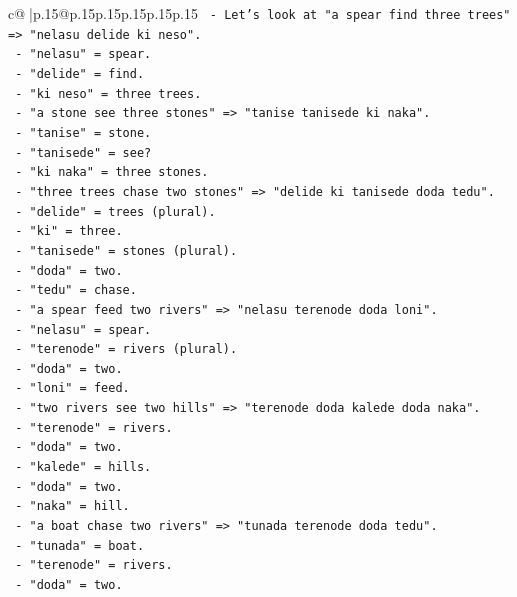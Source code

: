 \documentclass{article}
\begin{document}
{\begin{supertabular}{c@{$\;$}|p{.15\linewidth}@{}p{.15\linewidth}p{.15\linewidth}p{.15\linewidth}p{.15\linewidth}p{.15\linewidth}}
{{{\texttt{     {-} Let's look at "a spear find three trees" => "nelasu delide ki neso".} \\
\texttt{       {-} "nelasu" = spear.} \\
\texttt{       {-} "delide" = find.} \\
\texttt{       {-} "ki neso" = three trees.} \\
\texttt{     {-} "a stone see three stones" => "tanise tanisede ki naka".} \\
\texttt{       {-} "tanise" = stone.} \\
\texttt{       {-} "tanisede" = see?} \\
\texttt{       {-} "ki naka" = three stones.} \\
\texttt{     {-} "three trees chase two stones" => "delide ki tanisede doda tedu".} \\
\texttt{       {-} "delide" = trees (plural).} \\
\texttt{       {-} "ki" = three.} \\
\texttt{       {-} "tanisede" = stones (plural).} \\
\texttt{       {-} "doda" = two.} \\
\texttt{       {-} "tedu" = chase.} \\
\texttt{     {-} "a spear feed two rivers" => "nelasu terenode doda loni".} \\
\texttt{       {-} "nelasu" = spear.} \\
\texttt{       {-} "terenode" = rivers (plural).} \\
\texttt{       {-} "doda" = two.} \\
\texttt{       {-} "loni" = feed.} \\
\texttt{     {-} "two rivers see two hills" => "terenode doda kalede doda naka".} \\
\texttt{       {-} "terenode" = rivers.} \\
\texttt{       {-} "doda" = two.} \\
\texttt{       {-} "kalede" = hills.} \\
\texttt{       {-} "doda" = two.} \\
\texttt{       {-} "naka" = hill.} \\
\texttt{     {-} "a boat chase two rivers" => "tunada terenode doda tedu".} \\
\texttt{       {-} "tunada" = boat.} \\
\texttt{       {-} "terenode" = rivers.} \\
\texttt{       {-} "doda" = two.} \\
}}}
\end{supertabular}}
\end{document}
